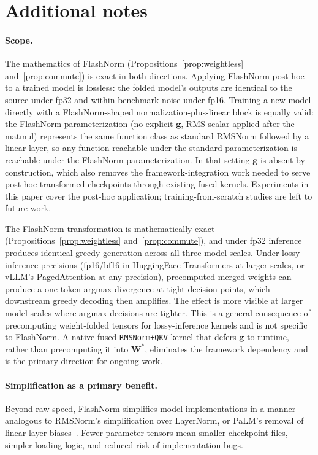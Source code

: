 \documentclass{article}
\begin{document}



\appendix

\section{Additional notes}\label{app:additional-notes}

\paragraph{Scope.} The mathematics of FlashNorm (Propositions~\ref{prop:weightless} and~\ref{prop:commute}) is exact in both directions. Applying FlashNorm post-hoc to a trained model is lossless: the folded model's outputs are identical to the source under fp32 and within benchmark noise under fp16. Training a new model directly with a FlashNorm-shaped normalization-plus-linear block is equally valid: the FlashNorm parameterization (no explicit $\mathbf{g}$, RMS scalar applied after the matmul) represents the same function class as standard RMSNorm followed by a linear layer, so any function reachable under the standard parameterization is reachable under the FlashNorm parameterization. In that setting $\mathbf{g}$ is absent by construction, which also removes the framework-integration work needed to serve post-hoc-transformed checkpoints through existing fused kernels. Experiments in this paper cover the post-hoc application; training-from-scratch studies are left to future work.

The FlashNorm transformation is mathematically exact (Propositions~\ref{prop:weightless} and~\ref{prop:commute}), and under fp32 inference produces identical greedy generation across all three model scales. Under lossy inference precisions (fp16/bf16 in HuggingFace Transformers at larger scales, or vLLM's PagedAttention at any precision), precomputed merged weights can produce a one-token argmax divergence at tight decision points, which downstream greedy decoding then amplifies. The effect is more visible at larger model scales where argmax decisions are tighter. This is a general consequence of precomputing weight-folded tensors for lossy-inference kernels and is not specific to FlashNorm. A native fused \texttt{RMSNorm+QKV} kernel that defers $\mathbf{g}$ to runtime, rather than precomputing it into $\mathbf{W^\ast}$, eliminates the framework dependency and is the primary direction for ongoing work.

\paragraph{Simplification as a primary benefit.}
Beyond raw speed, FlashNorm simplifies model implementations in a manner analogous
to RMSNorm's simplification over LayerNorm, or PaLM's removal of linear-layer
biases~\citep{PaLM}. Fewer parameter tensors mean smaller checkpoint
files, simpler loading logic, and reduced risk of implementation bugs.
\end{document}
